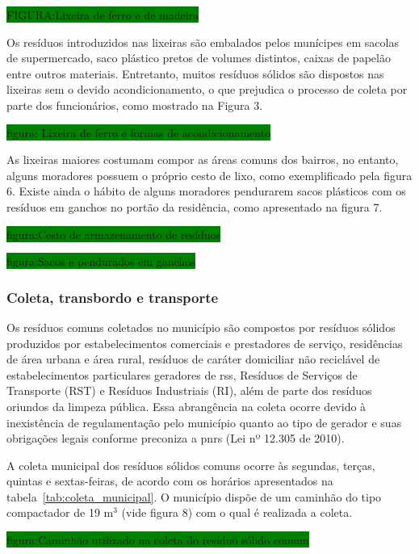	\colorbox{green}{FIGURA:Lixeira de ferro e de madeira}
	
	Os resíduos introduzidos nas lixeiras são embalados pelos munícipes em sacolas de supermercado, saco plástico pretos de volumes distintos, caixas de papelão entre outros materiais. Entretanto, muitos resíduos sólidos são dispostos nas lixeiras sem o devido acondicionamento, o que prejudica o processo de coleta por parte dos funcionários, como mostrado na Figura 3.
	
	\colorbox{green}{figura: Lixeira de ferro e formas de acondicionamento}
	
	As lixeiras maiores costumam compor as áreas comuns dos bairros, no entanto, alguns moradores possuem o próprio cesto de lixo, como exemplificado pela figura 6. Existe ainda o hábito de alguns moradores pendurarem sacos plásticos com os resíduos em ganchos no portão da residência, como apresentado na figura 7.
	
	\colorbox{green}{figura:Cesto de armazenamento de resíduos}
	
	\colorbox{green}{figura:Sacos e pendurados em ganchos}
	
	\subsubsection{Coleta, transbordo e transporte}
	
	Os resíduos comuns coletados no município são compostos por resíduos sólidos produzidos por estabelecimentos comerciais e prestadores de serviço, residências de área urbana e área rural, resíduos de caráter domiciliar não reciclável de estabelecimentos particulares geradores de \gls{rss}, Resíduos de Serviços de Transporte (RST) e Resíduos Industriais (RI), além de parte dos resíduos oriundos da limpeza pública. Essa abrangência na coleta ocorre devido à inexistência de regulamentação pelo município quanto ao tipo de gerador e suas obrigações legais conforme preconiza a \gls{pnrs} (Lei nº 12.305 de 2010).
	
	A coleta municipal dos resíduos sólidos comuns ocorre às segundas, terças, quintas e sextas-feiras, de acordo com os horários apresentados na tabela~\ref{tab:coleta_municipal}.  O município dispõe de um caminhão do tipo compactador de 19 m$^{3}$ (vide figura 8) com o qual é realizada a coleta.
	
%	
	
	\colorbox{green}{figura:Caminhão utilizado na coleta do resíduo sólido comum}
	
